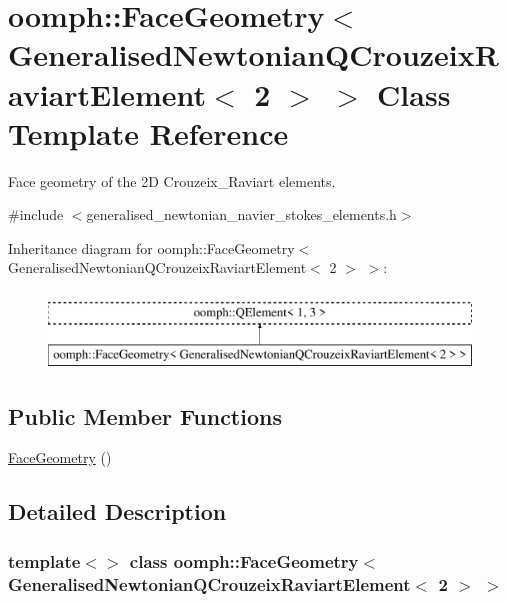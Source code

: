 \hypertarget{classoomph_1_1FaceGeometry_3_01GeneralisedNewtonianQCrouzeixRaviartElement_3_012_01_4_01_4}{}\section{oomph\+:\+:Face\+Geometry$<$ Generalised\+Newtonian\+Q\+Crouzeix\+Raviart\+Element$<$ 2 $>$ $>$ Class Template Reference}
\label{classoomph_1_1FaceGeometry_3_01GeneralisedNewtonianQCrouzeixRaviartElement_3_012_01_4_01_4}


Face geometry of the 2D Crouzeix\+\_\+\+Raviart elements.  




{\ttfamily \#include $<$generalised\+\_\+newtonian\+\_\+navier\+\_\+stokes\+\_\+elements.\+h$>$}

Inheritance diagram for oomph\+:\+:Face\+Geometry$<$ Generalised\+Newtonian\+Q\+Crouzeix\+Raviart\+Element$<$ 2 $>$ $>$\+:\begin{figure}[H]
\begin{center}
\leavevmode
\includegraphics[height=2.000000cm]{classoomph_1_1FaceGeometry_3_01GeneralisedNewtonianQCrouzeixRaviartElement_3_012_01_4_01_4}
\end{center}
\end{figure}
\subsection*{Public Member Functions}
\begin{DoxyCompactItemize}
\item 
\hyperlink{classoomph_1_1FaceGeometry_3_01GeneralisedNewtonianQCrouzeixRaviartElement_3_012_01_4_01_4_a616ab73e750e2b6c9ee435bfa85840bb}{Face\+Geometry} ()
\end{DoxyCompactItemize}


\subsection{Detailed Description}
\subsubsection*{template$<$$>$\newline
class oomph\+::\+Face\+Geometry$<$ Generalised\+Newtonian\+Q\+Crouzeix\+Raviart\+Element$<$ 2 $>$ $>$}

